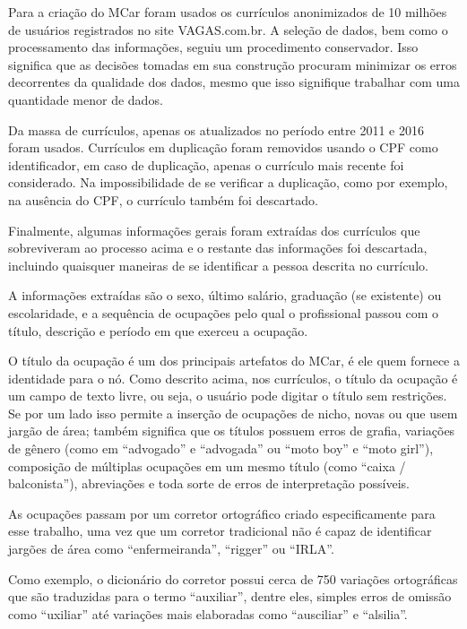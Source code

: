 \documentclass[
  article,
  11pt,
  a4paper,
  english,
  brazil,
  sumario=tradicional]{abntex2}
\begin{document}
Para a criação do MCar foram usados os currículos anonimizados de 10 milhões de usuários registrados no site VAGAS.com.br. A seleção de dados, bem como o processamento das informações, seguiu um procedimento conservador. Isso significa que as decisões tomadas em sua construção procuram minimizar os erros decorrentes da qualidade dos dados, mesmo que isso signifique trabalhar com uma quantidade menor de dados.

Da massa de currículos, apenas os atualizados no período entre 2011 e 2016 foram usados. Currículos em duplicação foram removidos usando o CPF como identificador, em caso de duplicação, apenas o currículo mais recente foi considerado. Na impossibilidade de se verificar a duplicação, como por exemplo, na ausência do CPF, o currículo também foi descartado.

Finalmente, algumas informações gerais foram extraídas dos currículos que sobreviveram ao processo acima e o restante das informações foi descartada, incluindo quaisquer maneiras de se identificar a pessoa descrita no currículo.

A informações extraídas são o sexo, último salário, graduação (se existente) ou escolaridade, e a sequência de ocupações pelo qual o profissional passou com o título, descrição e período em que exerceu a ocupação.

O título da ocupação é um dos principais artefatos do MCar, é ele quem fornece a identidade para o nó. Como descrito acima, nos currículos, o título da ocupação é um campo de texto livre, ou seja, o usuário pode digitar o título sem restrições. Se por um lado isso permite a inserção de ocupações de nicho, novas ou que usem jargão de área; também significa que os títulos possuem erros de grafia, variações de gênero (como em \enquote{advogado} e \enquote{advogada} ou \enquote{moto boy} e \enquote{moto girl}), composição de múltiplas ocupações em um mesmo título (como \enquote{caixa / balconista}), abreviações e toda sorte de erros de interpretação possíveis.

As ocupações passam por um corretor ortográfico criado especificamente para esse trabalho, uma vez que um corretor tradicional não é capaz de identificar jargões de área como \enquote{enfermeiranda}, \enquote{rigger} ou \enquote{IRLA}.

Como exemplo, o dicionário do corretor possui cerca de 750 variações ortográficas que são traduzidas para o termo \enquote{auxiliar}, dentre eles, simples erros de omissão como \enquote{uxiliar} até variações mais elaboradas como \enquote{ausciliar} e \enquote{alsilia}.
\end{document}
